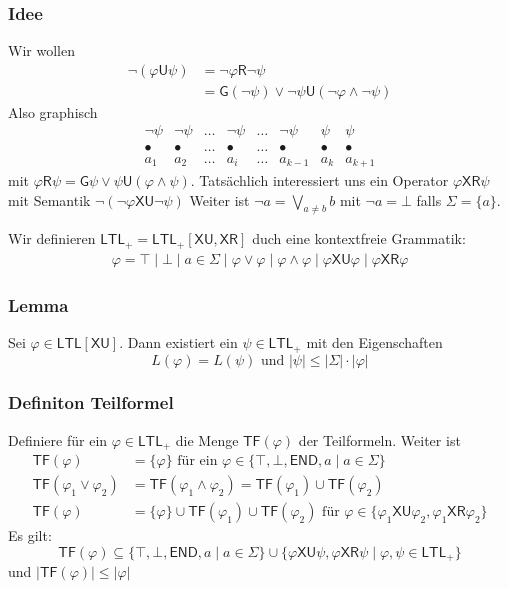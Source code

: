 \documentclass[12pt, german]{article}
\newcommand{\ltl}{\mathsf{LTL}}
\newcommand{\sX}{\mathsf{X}}
\newcommand{\sG}{\mathsf{G}}
\newcommand{\sU}{\mathsf{U}}
\newcommand{\sR}{\mathsf{R}}
\newcommand{\sende}{\mathsf{END}}
\newcommand{\tf}{\mathsf{TF}}
\begin{document}
\subsubsection{Idee}
	Wir wollen 
		\begin{align*}
			\neg(\varphi \sU \psi) &= \neg \varphi \sR \neg \psi \\ 
				&= \sG(\neg \psi) \lor \neg \psi \sU (\neg \varphi \land \neg \psi)
		\end{align*}
	Also graphisch
		\[ \begin{array}{*{9}{c}}
				\neg \psi &\neg \psi &\ldots &\neg \psi &\ldots &\neg\psi &\psi &\psi \\
				\bullet & 	\bullet &\ldots  &\bullet &\ldots &\bullet  &\bullet &\bullet  \\
				a_1 & a_2 &\ldots & a_i &\ldots &a_{k-1} &a_{k} &a_{k+1}
	\end{array}
		\]
		mit $\varphi \sR \psi = \sG \psi \lor \psi \sU (\varphi \land \psi)$. Tatsächlich interessiert uns ein Operator $\varphi \sX \sR \psi$ mit Semantik $\neg(\neg \varphi \sX \sU \neg \psi)$
		Weiter ist $\neg a = \bigvee_{a\not = b} b$ mit $\neg a = \bot $ falls $\Sigma =\{a\}$. 
		\newline
		
		Wir definieren $\ltl_+ = \ltl_+[\sX \sU, \sX\sR]$ duch eine kontextfreie Grammatik: 
			\begin{align*}
				\varphi = \top \mid \bot \mid a \in \Sigma \mid \varphi \lor \varphi \mid \varphi \land \varphi \mid \varphi \sX \sU \varphi \mid \varphi \sX\sR\varphi
			\end{align*}
\subsubsection{Lemma}
	Sei $\varphi \in \ltl[\sX\sU]$. Dann existiert ein $\psi \in \ltl_+$ mit den Eigenschaften $$L(\varphi) = L(\psi) \text{ und }|\psi| \leq |\Sigma| \cdot |\varphi|$$

\subsubsection{Definiton Teilformel}
	Definiere für ein $\varphi \in \ltl_+$ die Menge  $\tf(\varphi)$ der Teilformeln. Weiter ist
	\begin{align*}
		\tf(\varphi) &= \{\varphi\} \text{ für ein } \varphi \in \{\top, \bot, \sende, a \mid a \in \Sigma\} \\
		\tf(\varphi_1 \lor \varphi_2) &= \tf(\varphi_1 \land \varphi_2) = \tf(\varphi_1) \cup \tf(\varphi_2)\\
		 \tf(\varphi) &=\{\varphi\} \cup \tf(\varphi_1) \cup \tf(\varphi_2) \text{ für } \varphi \in \{\varphi_1 \sX\sU\varphi_2,  \varphi_1\sX\sR\varphi_2\}
	\end{align*}
	Es gilt: $$\tf(\varphi) \subseteq \{\top, \bot, \sende, a \mid a \in \Sigma\} \cup \{\varphi \sX\sU\psi, \varphi\sX\sR\psi \mid \varphi, \psi \in \ltl_+\}$$ und $|\tf(\varphi)| \leq |\varphi|$
\end{document}
